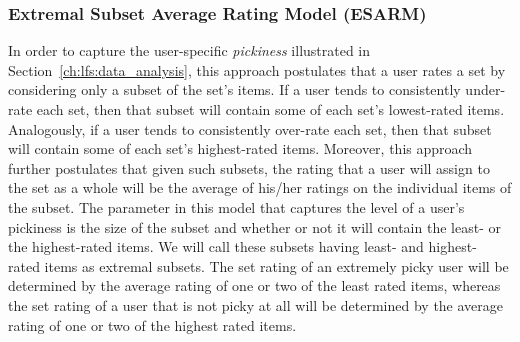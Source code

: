 \iffalse
Since we do not know the user's original item-level ratings, we use the user's
estimated ratings instead. That is,
\begin{equation} \label{avgSetEstEq}
  \begin{split}
    \hat{r}_{u}^s &= \frac{1}{|S|} \sum_{i \in \mathcal{S}} \hat{r}_{ui}.
  \end{split}
\end{equation}
\fi
   


\subsubsection*{Extremal Subset Average Rating Model (ESARM)}
In order to capture the user-specific \emph{pickiness} illustrated in Section~\ref{ch:lfs:data_analysis}, this approach postulates that a user rates a set by considering only a subset of the set's items. If a user tends to
consistently under-rate each set, then that subset will contain some of each
set's lowest-rated items. Analogously, if a
user tends to consistently over-rate each set, then that subset will contain
some of each set's highest-rated items.
Moreover, this approach further postulates that given such subsets, the rating
that a user will assign to the set as a
whole will be the average of his/her ratings on the individual items of the
subset. The parameter in this model that
captures the level of a user's pickiness is the size of the subset and whether
or not it will contain the least- or the
highest-rated items. We will call these subsets having least- and highest- rated
items as extremal subsets. The set rating of an extremely picky user will be
determined by the average rating of one or two of
the least rated items, whereas the set rating of a user that is not picky at all
will be determined by the average rating of
one or two of the highest rated items. 

